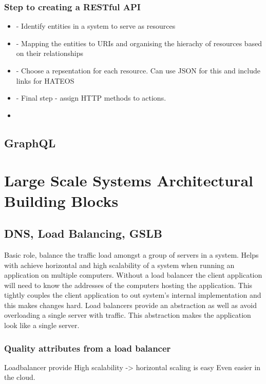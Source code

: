\documentclass[a4paper, 11pt]{book}
\begin{document}
    \subsection{Step to creating a RESTful API}
    \begin{itemize}
        \item - Identify entities in a system to serve as resources
        \item - Mapping the entities to URIs and organising the hierachy of resources based on their relationships
        \item - Choose a repsentation for each resource. Can use JSON for this and include links for HATEOS
        \item - Final step - assign HTTP methods to actions.
        \item
    \end{itemize}


    \section{GraphQL}

    


    \chapter{Large Scale Systems Architectural Building Blocks}


    \section{DNS, Load Balancing, GSLB}
    Basic role, balance the traffic load amongst a group of servers in a system.
    Helps with achieve horizontal and high scalability of a system when running an application on multiple computers.
    Without a load balancer the client application will need to know the addresses of the computers hosting the application.
    This tightly couples the client application to out system's internal implementation and this makes changes hard.
    Load balancers provide an abstraction as well as avoid overloading a single server with traffic.
    This abstraction makes the application look like a single server.

    \subsection{Quality attributes from a load balancer}
    Loadbalancer provide
    High scalability -> horizontal scaling is easy
    Even easier in the cloud.
\end{document}
